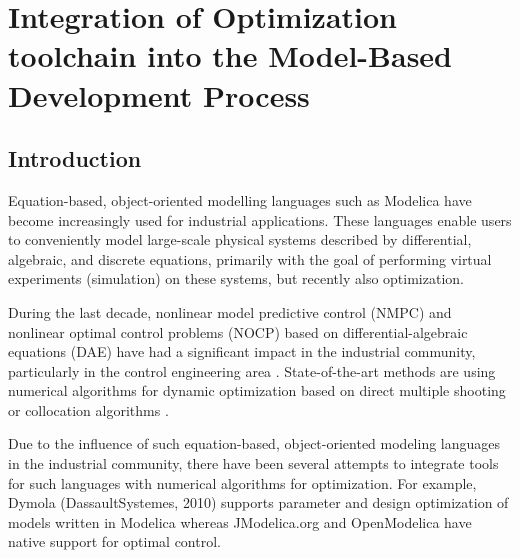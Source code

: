

\chapter{Integration of Optimization toolchain into the Model-Based Development Process}
\label{cha:optimization}


\section{Introduction}
\label{sec:optimizationintroduction}

Equation-based, object-oriented modelling languages such as Modelica  have become increasingly used for
industrial applications. These languages enable users to conveniently model large-scale physical systems described by 
differential, algebraic, and discrete equations, primarily with the goal of performing virtual experiments (simulation) 
on these systems, but recently also optimization.

During the last decade, nonlinear model predictive control (NMPC) and nonlinear optimal control problems (NOCP)
based on differential-algebraic equations (DAE) have had a significant impact in the industrial community, particularly in
the control engineering area \cite{biegler, tamimi}. State-of-the-art methods are using numerical
algorithms for dynamic optimization based on direct multiple shooting \cite{bock} or collocation algorithms
\cite{biegler}.

Due to the influence of such equation-based, object-oriented modeling languages in the industrial community, there have
been several attempts to integrate tools for such languages with numerical algorithms for optimization. For example,
Dymola (DassaultSystemes, 2010) supports parameter and design optimization of models written in Modelica whereas
JModelica.org \cite{akesson} and OpenModelica \cite{bernhard} have native support for optimal
control.

